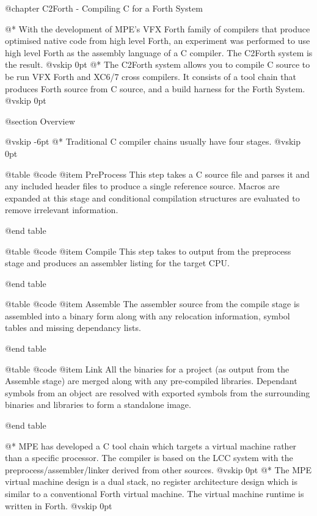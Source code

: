 
@chapter C2Forth - Compiling C for a Forth System

@*
With the development of MPE's VFX Forth family of compilers
that produce optimised native code from high level Forth,
an experiment was performed to use high level Forth as the
assembly language of a C compiler. The C2Forth system is the
result.
@vskip 0pt
@*
The C2Forth system allows you to compile C source to be run
VFX Forth and XC6/7 cross compilers. It consists of a tool
chain that produces Forth source from C source, and a build
harness for the Forth System.
@vskip 0pt

@section Overview


@vskip -6pt
@*
Traditional C compiler chains usually have four stages.
@vskip 0pt


@table @code
@item PreProcess
This step takes a C source file and parses it
 and any included header files to produce a
 single reference source. Macros are expanded at
 this stage and conditional compilation structures
 are evaluated to remove irrelevant information.

@end table



@table @code
@item Compile
This step takes to output from the preprocess
 stage and produces an assembler listing for the
 target CPU.

@end table



@table @code
@item Assemble
The assembler source from the compile stage is
 assembled into a binary form along with any
 relocation information, symbol tables and
 missing dependancy lists.

@end table



@table @code
@item Link
All the binaries for a project (as output from
 the Assemble stage) are merged along with any
 pre-compiled libraries. Dependant symbols from
 an object are resolved with exported symbols
 from the surrounding binaries and libraries to
 form a standalone image.

@end table

@*
MPE has developed a C tool chain which targets a virtual machine
rather than a specific processor. The compiler is based on the LCC
system with the preprocess/assembler/linker derived from other
sources.
@vskip 0pt
@*
The MPE virtual machine design is a dual stack, no register
architecture design which is similar to a conventional Forth
virtual machine. The virtual machine runtime is written in
Forth.
@vskip 0pt

